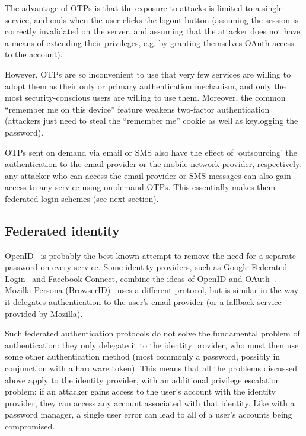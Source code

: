 The advantage of OTPs is that the exposure to attacks is limited to a single service, and ends when
the user clicks the logout button (assuming the session is correctly invalidated on the server, and
assuming that the attacker does not have a means of extending their privileges, e.g. by granting
themselves OAuth access to the account).

However, OTPs are so inconvenient to use that very few services are willing to adopt them as their
only or primary authentication mechanism, and only the most security-conscious users are willing to
use them. Moreover, the common ``remember me on this device'' feature weakens two-factor
authentication (attackers just need to steal the ``remember me'' cookie as well as keylogging the
password).

OTPs sent on demand via email or SMS also have the effect of `outsourcing' the authentication to the
email provider or the mobile network provider, respectively: any attacker who can access the email
provider or SMS messages can also gain access to any service using on-demand OTPs. This essentially
makes them federated login schemes (see next section).

\subsection{Federated identity}

OpenID~\cite{OpenID} is probably the best-known attempt to remove the need for a separate password
on every service. Some identity providers, such as Google Federated Login~\cite{GoogleOpenID} and
Facebook Connect, combine the ideas of OpenID and OAuth~\cite{OAuth}. Mozilla Persona
(BrowserID)~\cite{Persona, BrowserID} uses a different protocol, but is similar in the way it
delegates authentication to the user's email provider (or a fallback service provided by Mozilla).

Such federated authentication protocols do not solve the fundamental problem of authentication: they
only delegate it to the identity provider, who must then use some other authentication method (most
commonly a password, possibly in conjunction with a hardware token). This means that all the
problems discussed above apply to the identity provider, with an additional privilege escalation
problem: if an attacker gains access to the user's account with the identity provider, they can
access any account associated with that identity. Like with a password manager, a single user error
can lead to all of a user's accounts being compromised.

